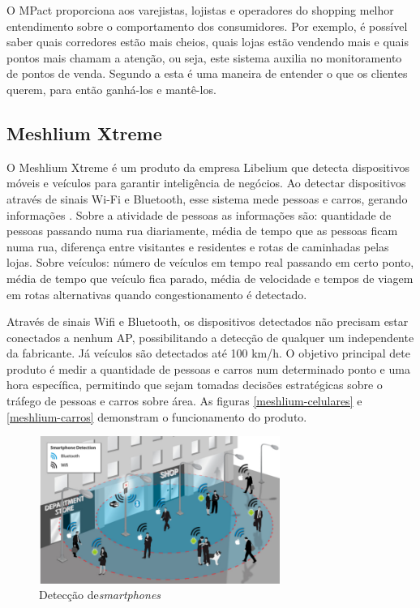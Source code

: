 O MPact proporciona aos varejistas, lojistas e operadores do shopping melhor
entendimento sobre o comportamento dos consumidores. Por exemplo, é possível
saber quais corredores estão mais cheios, quais lojas estão vendendo mais e
quais pontos mais chamam a atenção, ou seja, este sistema auxilia no
monitoramento de pontos de venda. Segundo a  esta é uma
maneira de entender o que os clientes querem, para então ganhá-los e mantê-los.

\subsection{Meshlium Xtreme}
O Meshlium Xtreme é um produto da empresa Libelium
que detecta dispositivos móveis e veículos para garantir inteligência de
negócios. Ao detectar dispositivos através de sinais Wi-Fi e Bluetooth, esse
sistema mede pessoas e carros, gerando informações \cite{libelium}. Sobre a
atividade de pessoas as informações são: quantidade de pessoas passando numa rua
diariamente, média de tempo que as pessoas ficam numa rua, diferença entre
visitantes e residentes e rotas de caminhadas pelas lojas. Sobre veículos:
número de veículos em tempo real passando em certo ponto, média de tempo que
veículo fica parado, média de velocidade e tempos de viagem em rotas
alternativas quando congestionamento é detectado.

Através de sinais Wifi e Bluetooth, os dispositivos detectados não precisam
estar conectados a nenhum AP, possibilitando a detecção de qualquer um
independente da fabricante. Já veículos são detectados até 100 km/h. O objetivo
principal dete produto é medir a quantidade de pessoas e carros num determinado
ponto e uma hora específica, permitindo que sejam tomadas decisões estratégicas
sobre o tráfego de pessoas e carros sobre área. As figuras
\autoref{meshlium-celulares} e \autoref{meshlium-carros} demonstram o
funcionamento do produto.

\begin{figure}[htb]
  \caption{\label{meshlium-celulares}Detecção de\emph{smartphones}}
  \begin{center}
    \includegraphics[width=0.70\textwidth]{img/meshlium-celulares.png}
  \end{center}
\end{figure}

